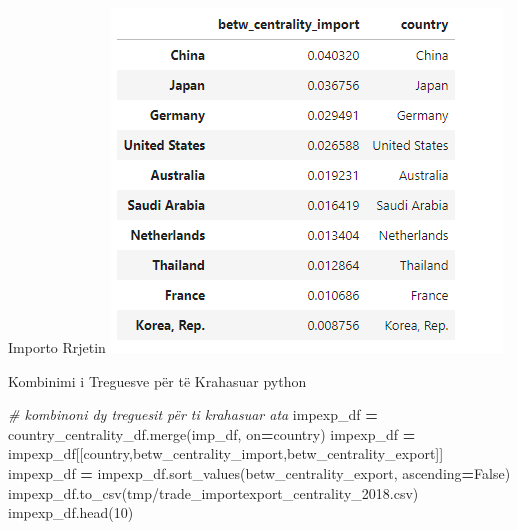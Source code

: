 \documentclass[
  ignorenonframetext,
]{beamer}
\newenvironment{Shaded}{\begin{snugshade}}{\end{snugshade}}
\newcommand{\CommentTok}[1]{\textcolor[rgb]{0.56,0.35,0.01}{\textit{#1}}}
\newcommand{\DecValTok}[1]{\textcolor[rgb]{0.00,0.00,0.81}{#1}}
\newcommand{\NormalTok}[1]{#1}
\newcommand{\OperatorTok}[1]{\textcolor[rgb]{0.81,0.36,0.00}{\textbf{#1}}}
\newcommand{\StringTok}[1]{\textcolor[rgb]{0.31,0.60,0.02}{#1}}
\newcommand{\VariableTok}[1]{\textcolor[rgb]{0.00,0.00,0.00}{#1}}
\begin{document}
\begin{frame}{Importo Rrjetin}
\protect\hypertarget{importo-rrjetin}{}
\includegraphics{./Figs/qnyje1.png}
\end{frame}

\begin{frame}[fragile]{Kombinimi i Treguesve për të Krahasuar}
\protect\hypertarget{kombinimi-i-treguesve-puxebr-tuxeb-krahasuar}{}
python

\begin{Shaded}
\begin{Highlighting}[]
\CommentTok{\# kombinoni dy treguesit për t\textquotesingle{}i krahasuar ata}
\NormalTok{impexp\_df }\OperatorTok{=}\NormalTok{ country\_centrality\_df.merge(imp\_df, on}\OperatorTok{=}\StringTok{\textquotesingle{}country\textquotesingle{}}\NormalTok{)}
\NormalTok{impexp\_df }\OperatorTok{=}\NormalTok{ impexp\_df[[}\StringTok{\textquotesingle{}country\textquotesingle{}}\NormalTok{,}\StringTok{\textquotesingle{}betw\_centrality\_import\textquotesingle{}}\NormalTok{,}\StringTok{\textquotesingle{}betw\_centrality\_export\textquotesingle{}}\NormalTok{]]}
\NormalTok{impexp\_df }\OperatorTok{=}\NormalTok{ impexp\_df.sort\_values(}\StringTok{\textquotesingle{}betw\_centrality\_export\textquotesingle{}}\NormalTok{, ascending}\OperatorTok{=}\VariableTok{False}\NormalTok{)}
\NormalTok{impexp\_df.to\_csv(}\StringTok{\textquotesingle{}tmp/trade\_importexport\_centrality\_2018.csv\textquotesingle{}}\NormalTok{)}
\NormalTok{impexp\_df.head(}\DecValTok{10}\NormalTok{)}
\end{Highlighting}
\end{Shaded}
\end{frame}
\end{document}
